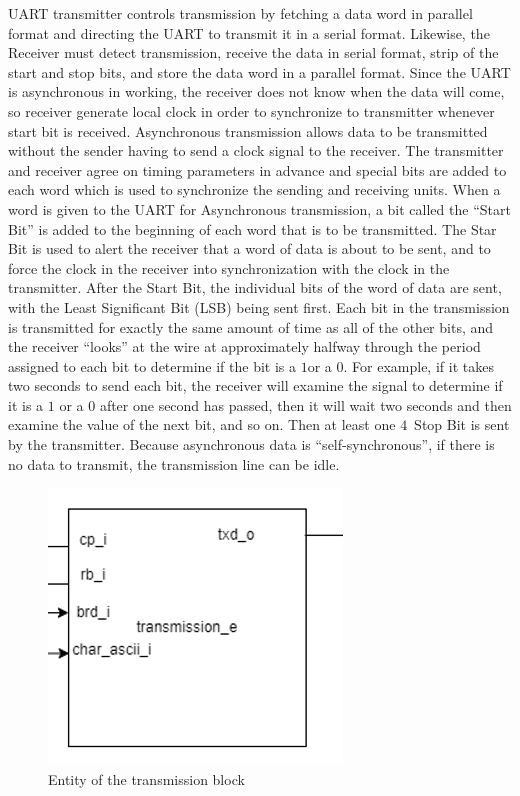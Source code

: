 \documentclass[12pt,a4paper]{article}
\begin{document}
UART transmitter controls transmission by fetching a data word in parallel format and directing the UART to transmit it in a serial format. Likewise, the Receiver must detect transmission, receive the data in serial format, strip of the start and stop bits, and store the data word in a parallel format. Since the UART is asynchronous in working, the receiver does not know when the data will come, so receiver generate local clock in order to synchronize to transmitter whenever start bit is received. Asynchronous transmission allows data to be transmitted without the sender having to send a clock signal to the receiver. The transmitter and receiver agree on timing parameters in advance and special bits are added to each word which is used to synchronize the sending and receiving units. When a word is given to the UART for Asynchronous transmission, a bit called the “Start Bit” is added to the beginning of each word that is to be transmitted. The Star Bit is used to alert the receiver that a word of data is about to be sent, and to force the clock in the receiver into synchronization with the clock in the transmitter. After the Start Bit, the individual bits of the word of data are sent, with the Least Significant Bit (LSB) being sent first. Each bit in the transmission is transmitted 
for exactly the same amount of time as all of the other bits, and the receiver “looks” at the wire at approximately halfway through the period assigned to each bit to determine if the bit is a $1$or a $0$. For example, if it takes two seconds to send each bit, the receiver will examine the signal to determine if it is a $1$ or a $0$ after one second has passed, then it will wait two seconds and then examine the value of the next bit, and so on. Then at least one $4$\ Stop Bit is sent by the transmitter. Because asynchronous data is “self-synchronous”, if there is no data to transmit, the transmission line can be idle. \\


\begin{figure}[H]
\centering
\includegraphics[scale=1.0]{txd.PNG}
\caption{Entity of the transmission block}
\label{Entity of the transmission block}
\end{figure}
\end{document}
